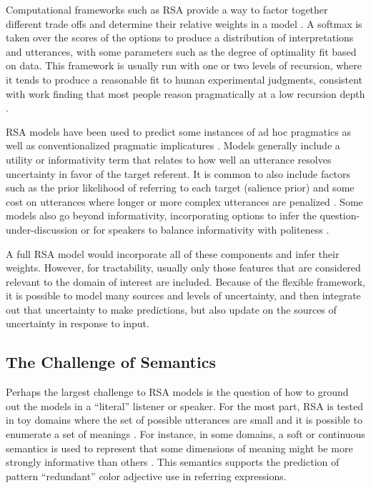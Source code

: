 \documentclass[]{article}
\begin{document}
Computational frameworks such as RSA provide a way to factor together different trade offs and determine their relative weights in a model \citep{goodman2016}. A softmax is taken over the scores of the options to produce a distribution of interpretations and utterances, with some parameters such as the degree of optimality fit based on data.  
This framework is usually run with one or two levels of recursion, where it tends to produce a reasonable fit to human experimental judgments, consistent with work finding that most people reason pragmatically at a low recursion depth \citep{franke2016}. 

RSA models have been used to predict some instances of ad hoc pragmatics as well as conventionalized pragmatic implicatures \citep{bergen, degen20200406, goodman2013}. Models generally include a utility or informativity term that relates to how well an utterance resolves uncertainty in favor of the target referent.  It is common to also include factors such as the prior likelihood of referring to each target (salience prior) and some cost on utterances where longer or more complex utterances are penalized \citep{goodman2016}. Some models also go beyond informativity, incorporating options to infer the question-under-discussion \citep{qing2016, kao2014} or for speakers to balance informativity with politeness \citep{yoon2018a}.

A full RSA model would incorporate all of these components and infer their weights. However, for tractability, usually only those features that are considered relevant to the domain of interest are included. Because of the flexible framework, it is possible to model many sources and levels of uncertainty, and then integrate out that uncertainty to make predictions, but also update on the sources of uncertainty in response to input. 

\subsection{The Challenge of Semantics}
Perhaps the largest challenge to RSA models is the question of how to ground out the models in a ``literal'' listener or speaker. For the most part, RSA is tested in toy domains where the set of possible utterances are small and it is possible to enumerate a set of meanings \citep{frank2012a,goodman2013, bergen}. For instance, in some domains, a soft or continuous semantics is used to represent that some dimensions of meaning might be more strongly informative than others \cite{degen20200406}. This semantics supports the prediction of pattern ``redundant'' color adjective use in referring expressions. 
\end{document}
